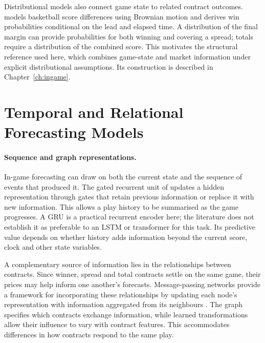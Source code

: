 \documentclass[12pt,a4paper,oneside]{report}
\begin{document}
Distributional models also connect game state to related contract outcomes.
\citet{stern1994brownian} models basketball score differences using Brownian
motion and derives win probabilities conditional on the lead and elapsed time.
A distribution of the final margin can provide probabilities for both winning
and covering a spread; totals require a distribution of the combined score.
This motivates the structural reference used here, which combines game-state
and market information under explicit distributional assumptions. Its
construction is described in Chapter~\ref{ch:ingame}.

\section{Temporal and Relational Forecasting Models}
\paragraph{Sequence and graph representations.}
In-game forecasting can draw on both the current state and the sequence of events
that produced it. The gated recurrent unit of \citet{cho2014learning} updates a
hidden representation through gates that retain previous information or replace
it with new information. This allows a play history to be summarised as the game
progresses. A GRU is a practical recurrent encoder here; the literature does not
establish it as preferable to an LSTM or transformer for this task. Its predictive
value depends on whether history adds information beyond the current score,
clock and other state variables.

A complementary source of information lies in the relationships between
contracts. Since winner, spread and total contracts settle on the same game,
their prices may help inform one another's forecasts. Message-passing networks
provide a framework for incorporating these relationships by updating each
node's representation with information aggregated from its neighbours
\citep{gilmer2017neural}. The graph specifies which contracts exchange
information, while learned transformations allow their influence to vary with
contract features. This accommodates differences in how contracts respond to
the same play.
\end{document}
